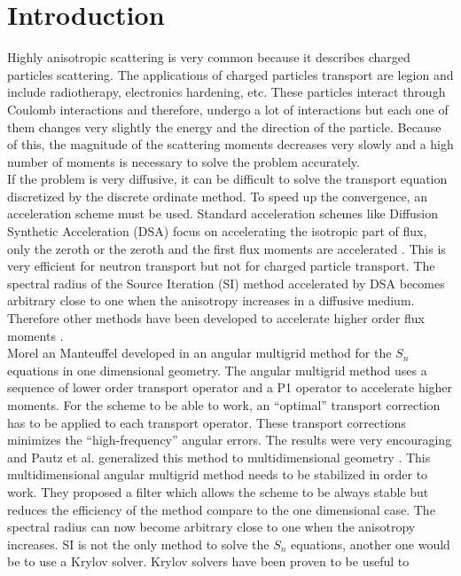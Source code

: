 \section{Introduction}
Highly anisotropic scattering is very common because it describes charged
particles scattering. The applications of charged particles transport are
legion and include radiotherapy, electronics hardening, etc. These particles 
interact through Coulomb interactions and therefore, undergo a lot of interactions 
but each one of them changes very slightly the energy and the direction of the 
particle. Because of
this, the magnitude of the scattering moments decreases very slowly and a high
number of moments is necessary to solve the problem accurately.\\
If the problem is very diffusive, it can be difficult to solve the transport
equation discretized by the discrete ordinate method. To speed up the
convergence, an acceleration scheme must be used. Standard acceleration schemes 
like Diffusion Synthetic Acceleration (DSA) focus on accelerating the isotropic 
part of flux, only the zeroth or the zeroth and the first flux 
moments are accelerated \cite{adams}. This is very efficient for neutron transport 
but not for charged particle transport. The spectral radius of the Source
Iteration (SI) method accelerated by DSA becomes arbitrary close to one when the 
anisotropy increases in a diffusive medium. Therefore other methods have been 
developed to accelerate higher order flux moments 
\cite{kassem,multigrid_1d,multigrid_2d}.\\
Morel an Manteuffel developed in \cite{multigrid_1d} an angular multigrid
method for the $S_n$ equations in one dimensional geometry. The angular
multigrid method uses a sequence of lower order transport operator and a
P1 operator to accelerate higher moments. For the scheme to be able to
work, an ``optimal'' transport correction has to be applied to each transport
operator. These transport corrections minimizes the ``high-frequency'' angular
errors. The results were very encouraging and Pautz et al. generalized this method 
to multidimensional geometry \cite{multigrid_2d}. This multidimensional
angular multigrid method needs to be stabilized in order to work. They proposed a 
filter which allows the scheme to be always stable but reduces the 
efficiency of the method compare to the one dimensional case. The spectral 
radius can now become arbitrary close to one when the anisotropy increases.
SI is not the only method to solve the $S_n$ equations, another one would be
to use a Krylov solver. Krylov solvers have been proven to be useful to
